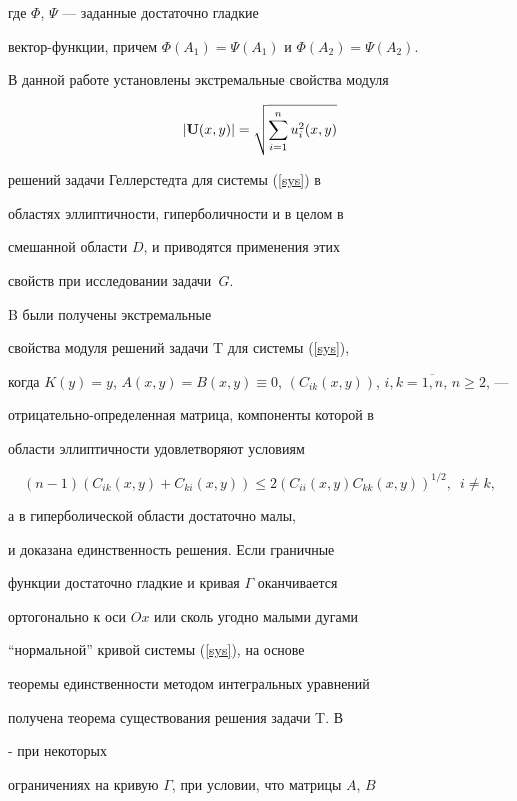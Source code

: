 где $\Phi$, $\Psi$ --- заданные достаточно гладкие 


вектор-функции, причем $\Phi (A_1)=\Psi(A_1)$ и $\Phi(A_2)=\Psi(A_2)$.





В данной работе установлены экстремальные свойства модуля


$$


|{\bold U}(x,y)|=\sqrt{\sum_{i=1}^n u_i^2(x,y)}


$$


решений задачи Геллерстедта для системы (\ref{sys}) в


областях эллиптичности, гиперболичности и в целом в


смешанной области $D$, и приводятся применения этих


свойств при исследовании задачи~$G$.





B \cite{Maj} были получены экстремальные


свойства модуля решений задачи T для системы (\ref{sys}),


когда $K(y)=y$, $A(x,y)=B(x,y)\equiv


0$, $(C_{ik}(x,y))$, $i,k=\overline{1,n}$, $n\ge2$, ---


отрицательно-определенная матрица, компоненты которой в


области эллиптичности удовлетворяют условиям


$$


(n-1)(C_{ik}(x,y)+C_{ki}(x,y))\le


2(C_{ii}(x,y)C_{kk}(x,y))^{1/2},\ \;i\ne k,


$$


а в гиперболической области достаточно малы,


и доказана единственность решения. Если граничные


функции достаточно гладкие и кривая $\Gamma$ оканчивается


ортогонально к оси $Ox$ или сколь угодно малыми дугами


``нормальной'' кривой системы (\ref{sys}), на основе


теоремы единственности методом интегральных уравнений


получена теорема существования решения задачи T. В


\cite{Did1}-\cite{Did3} при некоторых


ограничениях на кривую $\Gamma$, при условии, что матрицы $A$, $B$


